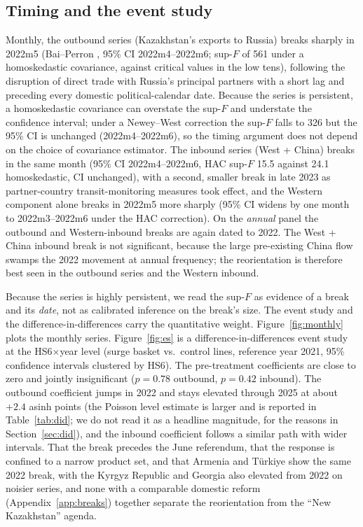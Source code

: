 \documentclass[12pt]{article}
\begin{document}
\subsection{Timing and the event study}

Monthly, the outbound series (Kazakhstan's exports to Russia) breaks sharply in 2022m5
(Bai--Perron \citep{baiperron1998}, 95\% CI 2022m4--2022m6; sup-$F$ \citep{andrews1993} of 561 under a homoskedastic covariance, against
critical values in the low tens), following the disruption of direct trade with Russia's principal partners with a short lag and preceding every domestic political-calendar date. Because the series is persistent, a homoskedastic
covariance can overstate the sup-$F$ and understate the confidence interval; under a
Newey--West \citep{neweywest1987} correction the sup-$F$ falls to 326 but the 95\% CI is unchanged (2022m4--2022m6),
so the timing argument does not depend on the choice of covariance estimator. The inbound
series (West + China) breaks in the same
month (95\% CI 2022m4--2022m6, HAC sup-$F$ 15.5 against 24.1 homoskedastic, CI unchanged), with
a second, smaller break in late 2023 as partner-country transit-monitoring measures took effect, and the Western component alone breaks in 2022m5 more sharply (95\% CI
widens by one month to 2022m3--2022m6 under the HAC correction). On the
\emph{annual} panel the outbound and Western-inbound breaks are again dated to 2022. The
West + China inbound break is not significant, because the large pre-existing China flow swamps
the 2022 movement at annual frequency; the reorientation is therefore best seen
in the outbound series and the Western inbound.

Because the series is highly persistent, we read the sup-$F$ as evidence of a break and its \emph{date}, not as calibrated inference on the break's size. The event study and the difference-in-differences carry the quantitative
weight. Figure~\ref{fig:monthly} plots the monthly series. Figure~\ref{fig:es} is a
difference-in-differences event study at the HS6$\times$year level
(surge basket vs.\ control lines, reference year 2021, 95\% confidence intervals clustered by
HS6). The pre-treatment coefficients are close to zero and jointly insignificant ($p = 0.78$
outbound, $p = 0.42$ inbound). The outbound coefficient jumps in 2022 and stays elevated
through 2025 at about $+2.4$ asinh points (the Poisson level estimate is larger and is
reported in Table~\ref{tab:did}; we do not read it as a headline magnitude, for the reasons in
Section~\ref{sec:did}), and the inbound coefficient follows a similar path with wider
intervals. That the break precedes the June
referendum, that the response is confined to a narrow product set, and that Armenia and
T\"urkiye show the same 2022 break, with the Kyrgyz Republic and Georgia also elevated from
2022 on noisier series, and none with a comparable domestic reform (Appendix~\ref{app:breaks})
together separate the reorientation from the ``New Kazakhstan'' agenda.
\end{document}
